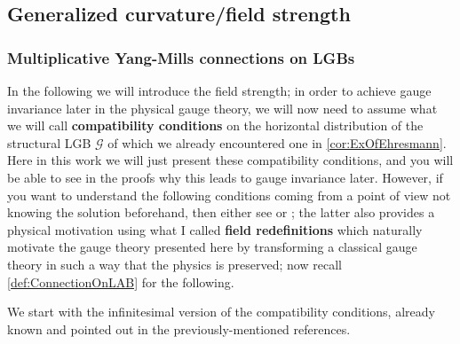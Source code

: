 \documentclass[reqno,a4paper,oneside]{amsart}
\theoremstyle{plain}
\theoremstyle{remark}
\theoremstyle{definition}
\begin{document}
\subsection{Generalized curvature/field strength}\label{CurvatureSubsection}

\subsubsection{Multiplicative Yang-Mills connections on LGBs}\label{MultiplicativeForms}

In the following we will introduce the field strength; in order to achieve gauge invariance later in the physical gauge theory, we will now need to assume what we will call \textbf{compatibility conditions} on the horizontal distribution of the structural LGB $\mathcal{G}$ of which we already encountered one in \ref{cor:ExOfEhresmann}. Here in this work we will just present these compatibility conditions, and you will be able to see in the proofs why this leads to gauge invariance later. However, if you want to understand the following conditions coming from a point of view not knowing the solution beforehand, then either see \cite{CurvedYMH} or \cite{MyThesis}; the latter also provides a physical motivation using what I called \textbf{field redefinitions} which naturally motivate the gauge theory presented here by transforming a classical gauge theory in such a way that the physics is preserved; now recall \ref{def:ConnectionOnLAB} for the following.

We start with the infinitesimal version of the compatibility conditions, already known and pointed out in the previously-mentioned references.
\end{document}
